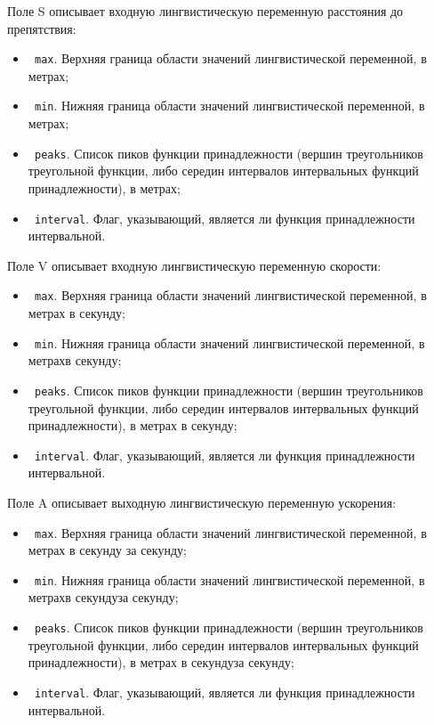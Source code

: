 Поле S описывает входную лингвистическую переменную расстояния до препятствия:
\begin{itemize}
	\item \lstinline! max!. Верхняя граница области значений лингвистической переменной, в метрах;
	\item \lstinline! min!. Нижняя граница области значений лингвистической переменной, в метрах;
	\item \lstinline! peaks!. Список пиков функции принадлежности (вершин треугольников треугольной функции, либо середин интервалов интервальных функций принадлежности), в метрах;
	\item \lstinline! interval!. Флаг, указывающий, является ли функция принадлежности интервальной.
\end{itemize}

Поле V описывает входную лингвистическую переменную скорости:
\begin{itemize}
	\item \lstinline! max!. Верхняя граница области значений лингвистической переменной, в метрах в секунду;
	\item \lstinline! min!. Нижняя граница области значений лингвистической переменной, в метрахв секунду;
	\item \lstinline! peaks!. Список пиков функции принадлежности (вершин треугольников треугольной функции, либо середин интервалов интервальных функций принадлежности), в метрах в секунду;
	\item \lstinline! interval!. Флаг, указывающий, является ли функция принадлежности интервальной.
\end{itemize}

Поле A описывает выходную лингвистическую переменную ускорения:
\begin{itemize}
	\item \lstinline! max!. Верхняя граница области значений лингвистической переменной, в метрах в секунду за секунду;
	\item \lstinline! min!. Нижняя граница области значений лингвистической переменной, в метрахв секундуза секунду;
	\item \lstinline! peaks!. Список пиков функции принадлежности (вершин треугольников треугольной функции, либо середин интервалов интервальных функций принадлежности), в метрах в секундуза секунду;
	\item \lstinline! interval!. Флаг, указывающий, является ли функция принадлежности интервальной.
\end{itemize}

